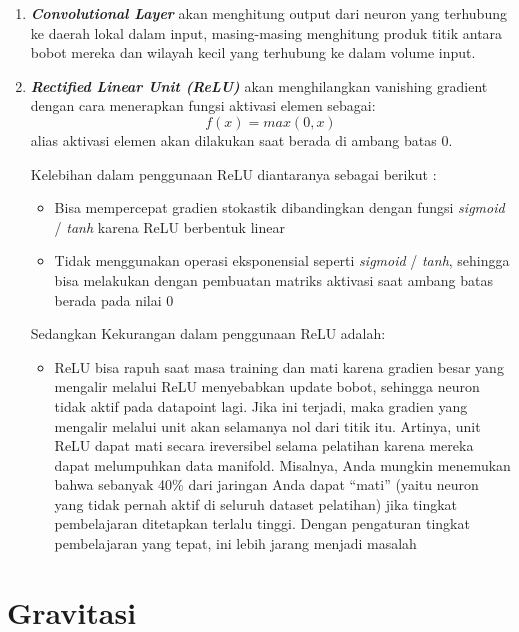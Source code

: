 \begin{enumerate}
	\item \textbf{\textit{Convolutional Layer}} akan menghitung output dari neuron yang terhubung ke daerah lokal dalam input, masing-masing menghitung produk titik antara bobot mereka dan wilayah kecil yang terhubung ke dalam volume input.
	
	\item \textbf{\textit{Rectiﬁed Linear Unit (ReLU)}} akan menghilangkan vanishing gradient dengan cara menerapkan fungsi aktivasi elemen sebagai:
	\begin{equation}
		\label{eq:relu} f(x) = max(0, x)
	\end{equation}
	alias aktivasi elemen akan dilakukan saat berada di ambang batas 0.
	
	Kelebihan dalam penggunaan ReLU diantaranya sebagai berikut :
	\begin{itemize}
		\item Bisa mempercepat gradien stokastik dibandingkan dengan fungsi \textit{sigmoid} / \textit{tanh} karena ReLU berbentuk linear
		\item Tidak menggunakan operasi eksponensial seperti \textit{sigmoid} / \textit{tanh}, sehingga bisa melakukan dengan pembuatan matriks aktivasi saat ambang batas berada pada nilai 0
	\end{itemize}
	
	Sedangkan Kekurangan dalam penggunaan ReLU adalah:
	\begin{itemize}
		\item ReLU bisa rapuh saat masa training dan mati karena gradien besar yang mengalir melalui ReLU menyebabkan update bobot, sehingga neuron tidak aktif pada datapoint lagi. Jika ini terjadi, maka gradien yang mengalir melalui unit akan selamanya nol dari titik itu. Artinya, unit ReLU dapat mati secara ireversibel selama pelatihan karena mereka dapat melumpuhkan data manifold. Misalnya, Anda mungkin menemukan bahwa sebanyak 40\% dari jaringan Anda dapat “mati” (yaitu neuron yang tidak pernah aktif di seluruh dataset pelatihan) jika tingkat pembelajaran ditetapkan terlalu tinggi. Dengan pengaturan tingkat pembelajaran yang tepat, ini lebih jarang menjadi masalah
	\end{itemize}
	
\end{enumerate}

\section{Gravitasi}
\label{sec:gravitasi}

